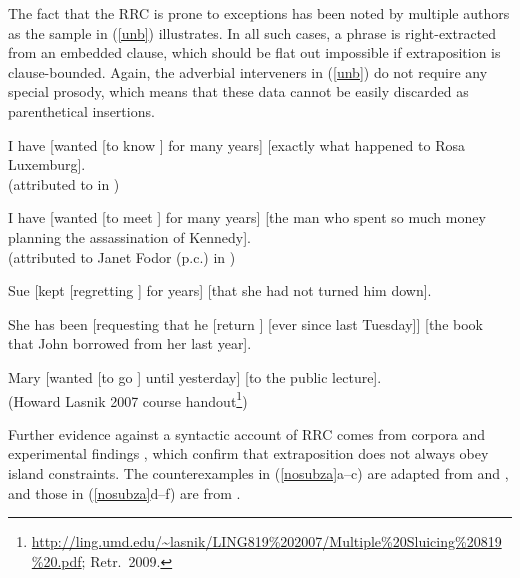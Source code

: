\documentclass[output=paper
                ,modfonts
                ,nonflat
	        ,collection
	        ,collectionchapter
	        ,collectiontoclongg
 	        ,biblatex
                ,babelshorthands
                ,newtxmath
                ,draftmode
                ,colorlinks, citecolor=brown
]{./langsci/langscibook}
\begin{document}
The fact that the RRC is prone to exceptions has been noted by multiple authors as the sample in 
 (\ref{unb}) illustrates. In all such cases, a phrase is right-extracted
 from an embedded clause, which should be flat out impossible if extraposition is clause-bounded. Again, the adverbial  interveners in (\ref{unb}) do not require any special prosody, which means that
  these data cannot be easily discarded as parenthetical insertions.
  
\eal \label{unb}
\ex I have  [wanted [to know \spc] for many years] [exactly what happened to Rosa Luxemburg].\\
(attributed to \citealt{
witten} in \citealt[92n]{postal74})

\ex I have  [wanted [to meet \spc] for many years] [the man who spent so much money planning the assassination of Kennedy].\\
(attributed to Janet Fodor (p.c.) in \citealt[177]{gazdar})

\ex Sue [kept [regretting \spc] for years] [that she had not turned
him down].\\
\citep{eynde96}

\ex She has been [requesting that he [return \spc] [ever since last Tuesday]] [the book
that John borrowed from her last year].\\
\citep[251]{kayne00}

\ex  Mary [wanted [to go \spc] until yesterday]  [to the public lecture].\\
(Howard Lasnik 2007 course handout\footnote{\url{http://ling.umd.edu/~lasnik/LING819\%202007/Multiple\%20Sluicing\%20819\%20.pdf}; Retr.\ 2009.})
\zl



Further evidence against a syntactic account of RRC comes from  corpora 
\citep{Mueller2004d,Mueller2007c} and experimental findings  \citep{strunk08,strunk}, which confirm
 that  extraposition does  not always obey  island constraints.  The counterexamples in (\ref{nosubza}a--c) are adapted from
 \citet{strunk08} and \citet{strunk}, and those in (\ref{nosubza}d--f) are from \citet[863]{chavesrnr}.



\eal \label{nosubza}


\end{document}
